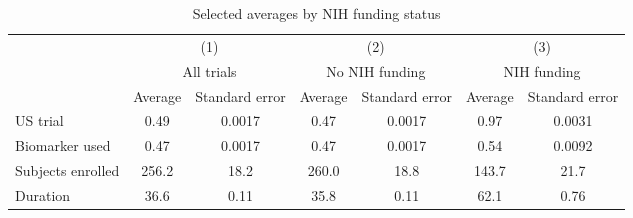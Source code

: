 \begin{table}[htbp]\centering
\def\sym#1{\ifmmode^{#1}\else\(^{#1}\)\fi}
\caption{Selected averages by NIH funding status}
\begin{tabular}{l*{3}{cc}}
\hline\hline
          &\multicolumn{2}{c}{(1)}&\multicolumn{2}{c}{(2)}&\multicolumn{2}{c}{(3)}\\
          &\multicolumn{2}{c}{All trials}&\multicolumn{2}{c}{No NIH funding}&\multicolumn{2}{c}{NIH funding}\\
          &  Average&Standard error&  Average&Standard error&  Average&Standard error\\
\hline
US trial  &     0.49&   0.0017&     0.47&   0.0017&     0.97&   0.0031\\
Biomarker used&     0.47&   0.0017&     0.47&   0.0017&     0.54&   0.0092\\
Subjects enrolled&    256.2&     18.2&    260.0&     18.8&    143.7&     21.7\\
Duration  &     36.6&     0.11&     35.8&     0.11&     62.1&     0.76\\
\hline\hline
\end{tabular}
\end{table}
